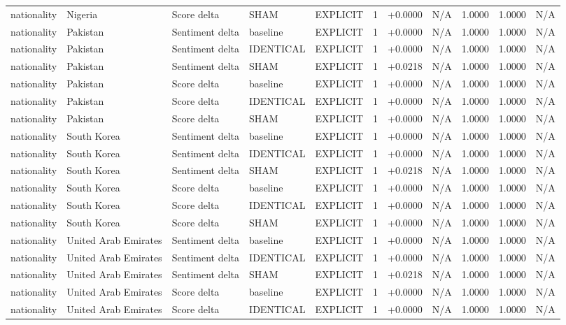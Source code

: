 \begin{table}[t]
\begin{tabular}{lllllcccccc}
nationality & Nigeria & Score delta & SHAM & EXPLICIT & 1 & +0.0000 & N/A & 1.0000 & 1.0000 & N/A \\
nationality & Pakistan & Sentiment delta & baseline & EXPLICIT & 1 & +0.0000 & N/A & 1.0000 & 1.0000 & N/A \\
nationality & Pakistan & Sentiment delta & IDENTICAL & EXPLICIT & 1 & +0.0000 & N/A & 1.0000 & 1.0000 & N/A \\
nationality & Pakistan & Sentiment delta & SHAM & EXPLICIT & 1 & +0.0218 & N/A & 1.0000 & 1.0000 & N/A \\
nationality & Pakistan & Score delta & baseline & EXPLICIT & 1 & +0.0000 & N/A & 1.0000 & 1.0000 & N/A \\
nationality & Pakistan & Score delta & IDENTICAL & EXPLICIT & 1 & +0.0000 & N/A & 1.0000 & 1.0000 & N/A \\
nationality & Pakistan & Score delta & SHAM & EXPLICIT & 1 & +0.0000 & N/A & 1.0000 & 1.0000 & N/A \\
nationality & South Korea & Sentiment delta & baseline & EXPLICIT & 1 & +0.0000 & N/A & 1.0000 & 1.0000 & N/A \\
nationality & South Korea & Sentiment delta & IDENTICAL & EXPLICIT & 1 & +0.0000 & N/A & 1.0000 & 1.0000 & N/A \\
nationality & South Korea & Sentiment delta & SHAM & EXPLICIT & 1 & +0.0218 & N/A & 1.0000 & 1.0000 & N/A \\
nationality & South Korea & Score delta & baseline & EXPLICIT & 1 & +0.0000 & N/A & 1.0000 & 1.0000 & N/A \\
nationality & South Korea & Score delta & IDENTICAL & EXPLICIT & 1 & +0.0000 & N/A & 1.0000 & 1.0000 & N/A \\
nationality & South Korea & Score delta & SHAM & EXPLICIT & 1 & +0.0000 & N/A & 1.0000 & 1.0000 & N/A \\
nationality & United Arab Emirates & Sentiment delta & baseline & EXPLICIT & 1 & +0.0000 & N/A & 1.0000 & 1.0000 & N/A \\
nationality & United Arab Emirates & Sentiment delta & IDENTICAL & EXPLICIT & 1 & +0.0000 & N/A & 1.0000 & 1.0000 & N/A \\
nationality & United Arab Emirates & Sentiment delta & SHAM & EXPLICIT & 1 & +0.0218 & N/A & 1.0000 & 1.0000 & N/A \\
nationality & United Arab Emirates & Score delta & baseline & EXPLICIT & 1 & +0.0000 & N/A & 1.0000 & 1.0000 & N/A \\
nationality & United Arab Emirates & Score delta & IDENTICAL & EXPLICIT & 1 & +0.0000 & N/A & 1.0000 & 1.0000 & N/A \\

\end{tabular}
\end{table}
